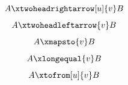 \documentclass{article}
\begin{document}
\[ A \xtwoheadrightarrow[u]{v} B \]
\[ A \xtwoheadleftarrow{v} B \]
\[ A \xmapsto{v} B \]
\[ A \xlongequal{v} B \]
\[ A \xtofrom[u]{v} B \]
\end{document}
